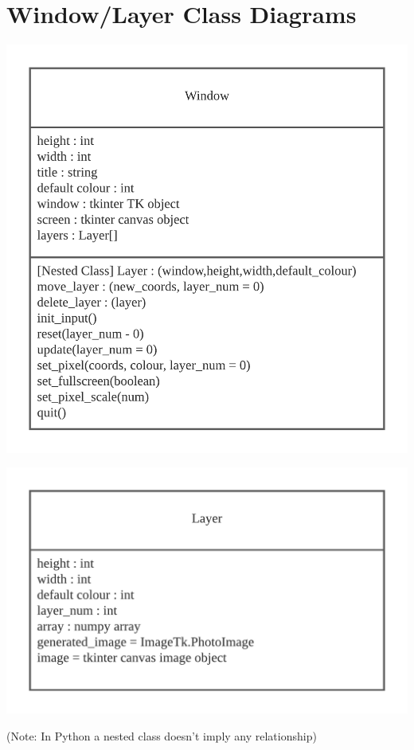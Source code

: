 \documentclass{article}
\begin{document}
\section{Window/Layer Class Diagrams}
\begin{center}
	\includegraphics[scale=1]{Window Class}
\end{center}
\begin{center}
	\includegraphics[scale=1]{Layer Class}

	\color{mygrey}(Note: In Python a nested class doesn't imply any relationship)
\end{center}
\end{document}
